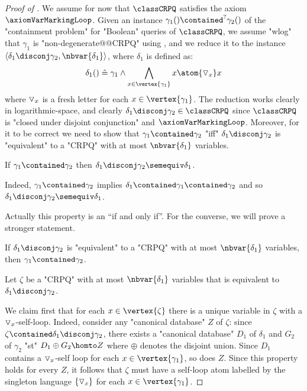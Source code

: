 \begin{proof}[Proof of ]
	We assume for now that $\classCRPQ$ satisfies
	the axiom $\axiomVarMarkingLoop$.
	Given an instance $\gamma_1() \contained^{?} \gamma_2()$ of the "containment problem" for "Boolean" queries of $\classCRPQ$,
	we assume "wlog" that $\gamma_1$ is "non-degenerate@@CRPQ" using ,
	and we reduce it to the instance $\langle \delta_1 \disconj \gamma_2, \nbvar{\delta_1} \rangle$,
	where $\delta_1$ is defined as:
	\[
		\delta_1() \defeq \gamma_1 \land \bigwedge_{x \in \vertex{\gamma_1}} x \atom{\marking_x} x
	\]
	where $\triangledown_x$ is a fresh letter for each $x \in \vertex{\gamma_1}$.
	The reduction works clearly in logarithmic-space,
	and clearly $\delta_1 \disconj \gamma_2 \in \classCRPQ$ since
	$\classCRPQ$ is "closed under disjoint conjunction" and $\axiomVarMarkingLoop$.
	Moreover, for it to be correct
	we need to show that $\gamma_1 \contained \gamma_2$ "iff" $\delta_1 \disconj \gamma_2$
	is "equivalent" to a "CRPQ" with at most $\nbvar{\delta_1}$ variables.

	\begin{claim}
		\AP\label{claim:reduction-containment-to-variable-minimization-1}
		If $\gamma_1 \contained \gamma_2$ then $\delta_1 \disconj \gamma_2 \semequiv \delta_1$.
	\end{claim}

	Indeed, $\gamma_1 \contained \gamma_2$ implies $\delta_1 \contained \gamma_1 \contained \gamma_2$ and so $\delta_1 \disconj \gamma_2 \semequiv \delta_1$.

	Actually this property is an ``if and only if''. For the converse, we will prove a stronger statement.

	\begin{claim}
		\AP\label{claim:reduction-containment-to-variable-minimization-2}
		If $\delta_1 \disconj \gamma_2$ is "equivalent" to a "CRPQ"
		with at most $\nbvar{\delta_1}$ variables, then $\gamma_1 \contained \gamma_2$.
	\end{claim}

	Let $\zeta$ be a "CRPQ" with at most $\nbvar{\delta_1}$ variables
	that is equivalent to $\delta_1 \disconj \gamma_2$.
	
	We claim first that for each $x \in \vertex{\zeta}$ there is a
	unique variable in $\zeta$ with a $\triangledown_x$-self-loop.
	Indeed, consider any "canonical database" $Z$ of $\zeta$:
	since $\zeta \contained \delta_1 \disconj \gamma_2$, there exists
	a "canonical database" $D_1$ of $\delta_1$ and $G_2$ of $\gamma_2$ "st"
	$D_1 \oplus G_2 \homto Z$ where $\oplus$ denotes the disjoint union.
	Since $D_1$ contains a $\triangledown_x$-self loop for each $x\in \vertex{\gamma_1}$,
	so does $Z$. Since this property holds for every $Z$, it follows that
	$\zeta$ must have a self-loop atom labelled by the singleton language $\{\triangledown_x\}$
	for each $x\in \vertex{\gamma_1}$.


\end{proof}
